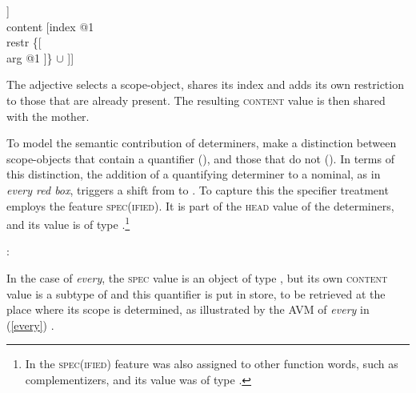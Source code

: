 \documentclass[output=paper
                ,modfonts
                ,nonflat
	        ,collection
	        ,collectionchapter
	        ,collectiontoclongg
 	        ,biblatex
                ,babelshorthands
                ,newtxmath
                ,draftmode
                ,colorlinks, citecolor=brown
]{./langsci/langscibook}
\begin{document}
\begin{exe} 
\ex\label{reddd}
\begin{avm}
[category|head [\type{adjective}                            \\
                mod|loc|content [\type{scope-object}        \\
                                 index @1                   \\
                                 restr \avmbox{$\Sigma$} ]] \\
 content [index @1                                          \\
          restr \{[                               \\
                   arg @1 ]\} $\cup$ \avmbox{$\Sigma$} ]]
\end{avm}
\end{exe}

\noindent
The adjective selects a scope-object, shares its index and adds its own 
restriction to those that are already present. The resulting \textsc{content} 
value is then shared with the mother.

To model the semantic contribution of determiners, \citet[135--136]{GS00} 
make a distinction between scope-objects that contain a quantifier 
(), and those that do not (). 
In terms of this distinction, the addition of a quantifying determiner to a nominal, 
as in \emph{every red box}, triggers a shift from  to . 
To capture this the specifier treatment employs the feature \textsc{spec(ified)}. 
It is part of the \textsc{head} value of the determiners, and its value is of type 
 \citep[362]{GS00}.\footnote{In \citet[45]{ps2} the \textsc{spec(ified)}
feature was also assigned to other function words, such as complementizers, 
and its value was of type .}   

\begin{exe} 
\ex   {}: \begin{avm}  \end{avm}  
\end{exe} 

\noindent
In the case of \emph{every}, the \textsc{spec} value is an object of 
type , but its own \textsc{content} value is a subtype of 
 and this quantifier is put in store, to be retrieved 
at the place where its scope is determined, as illustrated by the AVM
of \emph{every} in (\ref{every}) \citep[204]{GS00}.  
\end{document}
